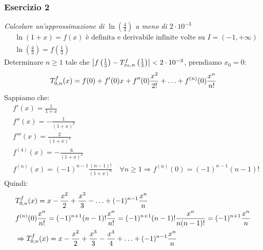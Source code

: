 \documentclass[12pt, a4paper]{report}
\begin{document}
            \subsubsection{Esercizio 2}
                \textit{Calcolare un'approssimazione di $\ln\left(\frac{4}{3}\right)$ a  meno di  $2\cdot 10^{-3}$}
                \begin{equation*}
                    \begin{split}
                        &\ln\left(1+x\right)=f(x) \text{ è definita e derivabile infinite volte su } I=(-1,+\infty) \\
                        &\ln\left(\frac{4}{3}\right) = f\left(\frac{1}{3}\right)
                    \end{split}
                \end{equation*}
                Determinare $n\geq 1$ tale che $\left|f\left(\frac{1}{3}\right)-\taylor{f}{x_{0}}{n}\left(\frac{1}{3}\right)\right|<2\cdot 10^{-3}$, prendiamo $x_{0}=0$:
                \begin{equation*}
                    \taylor{f}{0}{n}(x) = f(0)+f'(0)x+f''(0)\frac{x^{2}}{2!}+\ldots+f^{(n)}(0)\frac{x^{n}}{n!}
                \end{equation*}
                Sappiamo che:
                \begin{equation*}
                    \begin{split}
                        &f'(x) = \frac{1}{1+x} \\
                        &f''(x) = -\frac{1}{(1+x)^{2}} \\
                        &f'''(x) = \frac{2}{(1+x)^{3}} \\
                        &f^{(4)}(x) = -\frac{6}{(1+x)^{4}} \\
                        &f^{(n)}(x) = (-1)^{n-1}\frac{(n-1)!}{(1+x)^{n}} \quad \forall n\geq 1 \Rightarrow f^{(n)}(0) = (-1)^{n-1}(n-1)!
                    \end{split}
                \end{equation*}
                Quindi:
                \begin{equation*}
                    \begin{split}
                        &\taylor{f}{0}{n}(x) = x-\frac{x^{2}}{2}+\frac{x^{3}}{3}-\ldots+(-1)^{n-1}\frac{x^{n}}{n} \\
                        &f^{(n)}(0)\frac{x^{n}}{n!}=(-1)^{n+1}(n-1)!\frac{x^{n}}{n!} = (-1)^{n+1}(n-1)!\frac{x^{n}}{n(n-1)!} = (-1)^{n+1}\frac{x^{n}}{n} \\
                        &\Rightarrow \taylor{f}{0}{n}(x)=x-\frac{x^{2}}{2}+\frac{x^{3}}{3}-\frac{x^{4}}{4}+\ldots+(-1)^{n-1}\frac{x^{n}}{n}
                    \end{split}
                \end{equation*}
\end{document}
